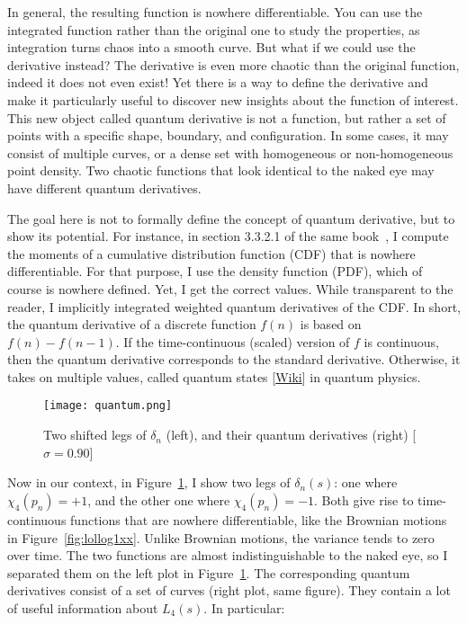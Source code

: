 \documentclass[oneside,10pt]{book}
\begin{document}
In general, the resulting function is nowhere differentiable. You can use the integrated function rather than the original one to study the properties,
 as integration turns chaos into a smooth curve. But what if we could use the derivative instead? The derivative is even more chaotic than the
 original function, indeed it does not even exist! Yet there is a way to define the derivative and make it particularly useful to discover
 new insights about the function of interest. This new object called \textcolor{index}{quantum derivative} is not a function, but rather a set of points with a specific shape, boundary, and configuration. 
 In some cases, it may consist of multiple curves, or a dense set with homogeneous or non-homogeneous point density.  Two chaotic functions that look identical to
 the naked eye may have different quantum derivatives. 



The goal here is not to formally define the concept of quantum derivative, but to show its potential. For instance, in section 
 3.3.2.1 of the same book~\cite{vgchaos}, I compute the moments of a cumulative distribution function (CDF) that is nowhere differentiable. For that purpose, I use
 the density function (PDF), which of course is nowhere defined. Yet, I get the correct values. While transparent to the reader, I implicitly 
 integrated weighted 
 quantum derivatives of the CDF. In short, the quantum derivative of a discrete function $f(n)$ is based on $f(n) - f(n-1)$. 
 If the time-continuous (scaled) version of $f$ is continuous, then the quantum derivative corresponds to the standard derivative. Otherwise, it takes 
 on multiple values, called \textcolor{index}{quantum states} [\href{https://en.wikipedia.org/wiki/Quantum_state}{Wiki}] in quantum physics. 

\begin{figure}[H]
\centering
\texttt{[image: quantum.png]}  
\caption{Two shifted legs of $\delta_n$ (left), and their quantum derivatives (right) [$\sigma=0.90$]}
\label{fig:lollod34sd}
\end{figure}

Now in our context, in Figure~\ref{fig:lollod34sd}, I show two legs of $\delta_n(s)$: one where $\chi_4(p_n) =+1$, and
 the other one where $\chi_4(p_n) =-1$. Both give rise to time-continuous functions that are nowhere differentiable,
 like the Brownian motions in Figure~\ref{fig:lollog1xx}. Unlike Brownian motions, the variance tends to zero over time. 
The two functions are almost indistinguishable to the naked eye, so I separated them on the left plot in Figure~\ref{fig:lollod34sd}. The corresponding quantum derivatives consist of a set of curves (right plot, same figure). They contain a lot of useful information about $L_4(s)$. In particular:
\vspace{1ex}
\end{document}
